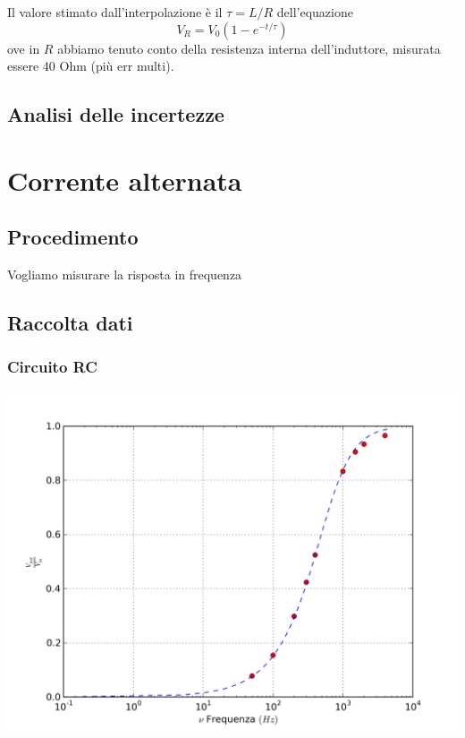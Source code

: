 Il valore stimato dall'interpolazione è il $\tau=L/R$ dell'equazione
$$V_R = V_0 (1-e^{-t/\tau})$$
ove in $R$ abbiamo tenuto conto della resistenza interna dell'induttore, misurata essere 40 Ohm (più err multi).


\subsection{Analisi delle incertezze}


\section{Corrente alternata}
\subsection{Procedimento}

Vogliamo misurare la risposta in frequenza 
\subsection{Raccolta dati}

\subsubsection{Circuito RC}

\begin{center}
 \includegraphics[scale=0.70]{grafici/C3/ddpcond.png}
\end{center}

